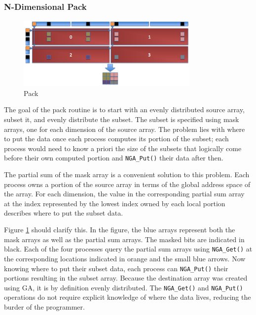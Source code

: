 \subsubsection{N-Dimensional Pack}
\label{section:alg_pack}

\begin{figure}[!t]
\center
\includegraphics[width=3.5in]{images/pack}
\caption{Pack}
\label{fig:pack}
\end{figure}

The goal of the pack routine is to start with an evenly distributed source
array, subset it, and evenly distribute the subset.  The subset is specified
using mask arrays, one for each dimension of the source array.  The problem
lies with where to put the data once each process computes its portion of the
subset; each process would need to know a priori the size of the subsets that
logically come before their own computed portion and \verb=NGA_Put()= their
data after then.

The partial sum of the mask array is a convenient solution to this problem.
Each process owns a portion of the source array in terms of the global address
space of the array.  For each dimension, the value in the corresponding
partial sum array at the index represented by the lowest index owned by each
local portion describes where to put the subset data.

Figure \ref{fig:pack} should clarify this.  In the figure, the blue arrays
represent both the mask arrays as well as the partial sum arrays.  The masked
bits are indicated in black.  Each of the four processes query the partial sum
arrays using \verb=NGA_Get()= at the corresponding locations indicated in
orange and the small blue arrows.  Now knowing where to put their subset data,
each process can \verb=NGA_Put()= their portions resulting in the subset
array.  Because the destination array was created using GA, it is by
definition evenly distributed.  The \verb=NGA_Get()= and \verb=NGA_Put()=
operations do not require explicit knowledge of where the data lives,
reducing the burder of the programmer.
